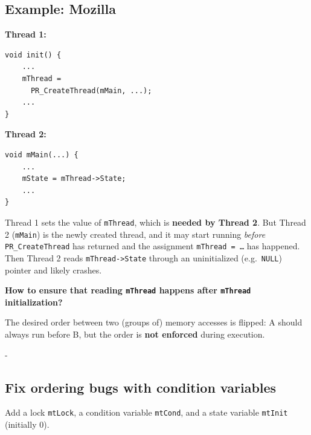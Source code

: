 \documentclass[11pt,a4paper]{article}
\makeatletter
\newcommand{\keepspace}[1]{\par\penalty-100\begingroup
  \setlength{\dimen@}{#1}\dimen@ii\pagegoal\advance\dimen@ii-\pagetotal
  \ifdim\dimen@>\dimen@ii\ifdim\dimen@ii>\z@\vfil\fi\break\fi\endgroup}
\makeatother
\begin{document}
\subsection{Example: Mozilla}

\begin{center}
\begin{minipage}[t]{0.5\textwidth}
\textbf{Thread 1:}
\begin{lstlisting}[numbers=none]
void init() {
    ...
    mThread =
      PR_CreateThread(mMain, ...);
    ...
}
\end{lstlisting}
\end{minipage}\hfill
\begin{minipage}[t]{0.44\textwidth}
\textbf{Thread 2:}
\begin{lstlisting}[numbers=none]
void mMain(...) {
    ...
    mState = mThread->State;
    ...
}
\end{lstlisting}
\end{minipage}
\end{center}

\begin{quizbox}
Thread 1 sets the value of \texttt{mThread}, which is \textbf{needed by
Thread 2}. But Thread 2 (\texttt{mMain}) is the newly created thread, and it
may start running \emph{before} \texttt{PR\_CreateThread} has returned and the
assignment \texttt{mThread = \ldots} has happened. Then Thread 2 reads
\texttt{mThread->State} through an uninitialized (e.g.\ \texttt{NULL})
pointer and likely crashes.

\textbf{How to ensure that reading \texttt{mThread} happens after
\texttt{mThread} initialization?}
\end{quizbox}

\begin{defbox}
The desired order between two (groups of) memory accesses is flipped: A
should always run before B, but the order is \textbf{not enforced} during
execution.
\end{defbox}

\keepspace{18\baselineskip}
\subsection{Fix ordering bugs with condition variables}

Add a lock \texttt{mtLock}, a condition variable \texttt{mtCond}, and a state
variable \texttt{mtInit} (initially 0).
\end{document}
